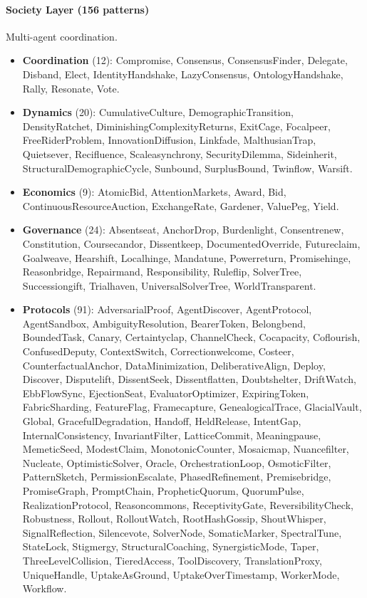 \paragraph{Society Layer (156 patterns)} Multi-agent coordination.
\begin{itemize}
    \item \textbf{Coordination} (12): Compromise, Consensus, ConsensusFinder, Delegate, Disband, Elect, IdentityHandshake, LazyConsensus, OntologyHandshake, Rally, Resonate, Vote.
    \item \textbf{Dynamics} (20): CumulativeCulture, DemographicTransition, DensityRatchet, DiminishingComplexityReturns, ExitCage, Focalpeer, FreeRiderProblem, InnovationDiffusion, Linkfade, MalthusianTrap, Quietsever, Recifluence, Scaleasynchrony, SecurityDilemma, Sideinherit, StructuralDemographicCycle, Sunbound, SurplusBound, Twinflow, Warsift.
    \item \textbf{Economics} (9): AtomicBid, AttentionMarkets, Award, Bid, ContinuousResourceAuction, ExchangeRate, Gardener, ValuePeg, Yield.
    \item \textbf{Governance} (24): Absentseat, AnchorDrop, Burdenlight, Consentrenew, Constitution, Coursecandor, Dissentkeep, DocumentedOverride, Futureclaim, Goalweave, Hearshift, Localhinge, Mandatune, Powerreturn, Promisehinge, Reasonbridge, Repairmand, Responsibility, Ruleflip, SolverTree, Successiongift, Trialhaven, UniversalSolverTree, WorldTransparent.
    \item \textbf{Protocols} (91): AdversarialProof, AgentDiscover, AgentProtocol, AgentSandbox, AmbiguityResolution, BearerToken, Belongbend, BoundedTask, Canary, Certaintyclap, ChannelCheck, Cocapacity, Coflourish, ConfusedDeputy, ContextSwitch, Correctionwelcome, Costeer, CounterfactualAnchor, DataMinimization, DeliberativeAlign, Deploy, Discover, Disputelift, DissentSeek, Dissentflatten, Doubtshelter, DriftWatch, EbbFlowSync, EjectionSeat, EvaluatorOptimizer, ExpiringToken, FabricSharding, FeatureFlag, Framecapture, GenealogicalTrace, GlacialVault, Global, GracefulDegradation, Handoff, HeldRelease, IntentGap, InternalConsistency, InvariantFilter, LatticeCommit, Meaningpause, MemeticSeed, ModestClaim, MonotonicCounter, Mosaicmap, Nuancefilter, Nucleate, OptimisticSolver, Oracle, OrchestrationLoop, OsmoticFilter, PatternSketch, PermissionEscalate, PhasedRefinement, Premisebridge, PromiseGraph, PromptChain, PropheticQuorum, QuorumPulse, RealizationProtocol, Reasoncommons, ReceptivityGate, ReversibilityCheck, Robustness, Rollout, RolloutWatch, RootHashGossip, ShoutWhisper, SignalReflection, Silencevote, SolverNode, SomaticMarker, SpectralTune, StateLock, Stigmergy, StructuralCoaching, SynergisticMode, Taper, ThreeLevelCollision, TieredAccess, ToolDiscovery, TranslationProxy, UniqueHandle, UptakeAsGround, UptakeOverTimestamp, WorkerMode, Workflow.
\end{itemize}
